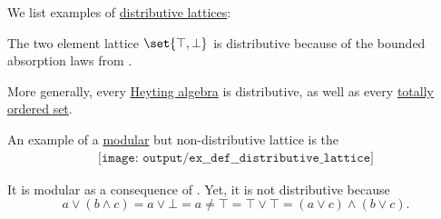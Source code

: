 \begin{example}\label{ex:def:distributive_lattice}
  We list examples of \hyperref[def:distributive_lattice]{distributive lattices}:
  \begin{thmenum}
     The two element lattice \( \set{ \top, \bot } \) is distributive because of the bounded absorption laws from .

    More generally, every \hyperref[def:heyting_algebra]{Heyting algebra} is distributive, as well as every \hyperref[def:totally_ordered_set]{totally ordered set}.

     An example of a \hyperref[def:modular_lattice]{modular} but non-distributive lattice is the 
    \begin{equation}\label{eq:ex:def:distributive_lattice/diamond}\tag{\( M_3 \)}
      \begin{aligned}
        \texttt{[image: output/ex\_\_def\_\_distributive\_lattice]}
      \end{aligned}
    \end{equation}

    It is modular as a consequence of . Yet, it is not distributive because
    \begin{equation*}
      a \vee (b \wedge c) = a \vee \bot = a
      \neq
      \top = \top \vee \top = (a \vee c) \wedge (b \vee c).
    \end{equation*}
  \end{thmenum}
\end{example}

